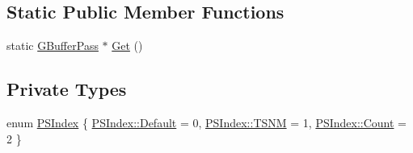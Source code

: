 \subsection*{Static Public Member Functions}
\begin{DoxyCompactItemize}
\item 
static \hyperlink{classmage_1_1_g_buffer_pass}{G\+Buffer\+Pass} $\ast$ \hyperlink{classmage_1_1_g_buffer_pass_ab2a50a7bde900978153badaa49cf047c}{Get} ()
\end{DoxyCompactItemize}
\subsection*{Private Types}
\begin{DoxyCompactItemize}
\item 
enum \hyperlink{classmage_1_1_g_buffer_pass_a1dbae3cb33d9c90ce7eb8c119d576379}{P\+S\+Index} \{ \hyperlink{classmage_1_1_g_buffer_pass_a1dbae3cb33d9c90ce7eb8c119d576379a7a1920d61156abc05a60135aefe8bc67}{P\+S\+Index\+::\+Default} = 0, 
\hyperlink{classmage_1_1_g_buffer_pass_a1dbae3cb33d9c90ce7eb8c119d576379a6e02c9f63944ea221e7d55c11ecae07b}{P\+S\+Index\+::\+T\+S\+NM} = 1, 
\hyperlink{classmage_1_1_g_buffer_pass_a1dbae3cb33d9c90ce7eb8c119d576379ae93f994f01c537c4e2f7d8528c3eb5e9}{P\+S\+Index\+::\+Count} = 2
 \}
\end{DoxyCompactItemize}
